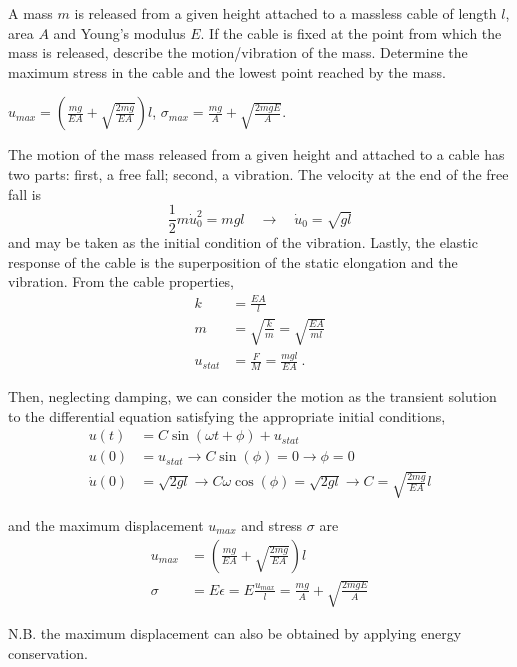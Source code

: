 
\begin{Exercise}[label={mass_released}]
A mass $m$ is released from a given height attached to a massless cable of length $l$, area $A$ and Young's modulus $E$. If the cable is fixed at the point from which the mass is released, describe the motion/vibration of the mass. Determine the maximum stress in the cable and the lowest point reached by the mass.

\begin{center}
\end{center}

\shortAnswer $u_{max} = \left(\frac{mg}{EA} + \sqrt{\frac{2mg}{EA}}\right)l$, $\sigma_{max} = \frac{mg}{A} + \sqrt{\frac{2mgE}{A}}$.
\end{Exercise}



\begin{Answer}[ref={mass_released}]
The motion of the mass released from a given height and attached to a cable has two parts: first, a free fall; second, a vibration. The velocity at the end of the free fall is
$$
\frac{1}{2}m\dot{u}_0^2 = mgl \quad \rightarrow \quad \dot{u}_0 = \sqrt{gl}
$$
and may be taken as the initial condition of the vibration. Lastly, the elastic response of the cable is the superposition of the static elongation and the vibration. From the cable properties,
\begin{align*}
k &= \frac{EA}{l} \\
m &= \sqrt{\frac{k}{m}} = \sqrt{\frac{EA}{ml}} \\
u_{stat} &= \frac{F}{M} = \frac{mgl}{EA}\ .
\end{align*}

Then, neglecting damping, we can consider the motion as the transient solution to the differential equation satisfying the appropriate initial conditions,
\begin{align*}
u(t) &= C\sin(\omega t + \phi) + u_{stat} \\
u(0) &= u_{stat} \rightarrow C\sin(\phi) = 0 \rightarrow \phi = 0 \\
\dot{u}(0) &= \sqrt{2gl} \rightarrow C\omega\cos(\phi) =  \sqrt{2gl} \rightarrow C = \sqrt{\frac{2mg}{EA}}l
\end{align*}

and the maximum displacement $u_{max}$ and stress $\sigma$ are
\begin{align*}
u_{max} &= \left(\frac{mg}{EA} + \sqrt{\frac{2mg}{EA}}\right)l \\
\sigma &= E\epsilon = E\frac{u_{max}}{l} = \frac{mg}{A} + \sqrt{\frac{2mgE}{A}}
\end{align*}

N.B. the maximum displacement can also be obtained by applying energy conservation.
\end{Answer}
